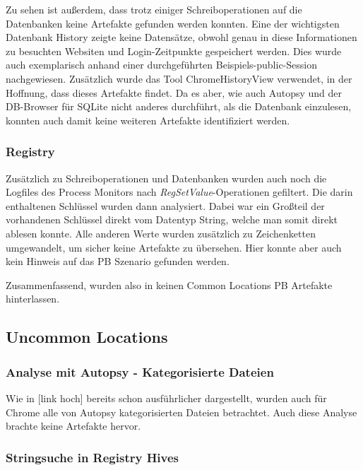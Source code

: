 \begin{appendices}
Zu sehen ist außerdem, dass trotz einiger Schreiboperationen auf die Datenbanken keine Artefakte gefunden werden konnten. Eine der wichtigsten Datenbank \glqq{}History\grqq{} zeigte keine Datensätze, obwohl genau in diese Informationen zu besuchten Websiten und Login-Zeitpunkte gespeichert werden. Dies wurde auch exemplarisch anhand einer durchgeführten Beispiels-public-Session nachgewiesen. Zusätzlich wurde das Tool \glqq{}ChromeHistoryView\grqq{} verwendet, in der Hoffnung, dass dieses Artefakte findet. Da es aber, wie auch Autopsy und der DB-Browser für SQLite nicht anderes durchführt, als die Datenbank einzulesen, konnten auch damit keine weiteren Artefakte identifiziert werden.

\subsubsection*{Registry}

Zusätzlich zu Schreiboperationen und Datenbanken wurden auch noch die Logfiles des Process Monitors nach \textit{RegSetValue}-Operationen gefiltert. Die darin enthaltenen Schlüssel wurden dann analysiert. Dabei war ein Großteil der vorhandenen Schlüssel direkt vom Datentyp String, welche man somit direkt ablesen konnte. Alle anderen Werte wurden zusätzlich zu Zeichenketten umgewandelt, um sicher keine Artefakte zu übersehen. Hier konnte aber auch kein Hinweis auf das PB Szenario gefunden werden. 

Zusammenfassend, wurden also in keinen Common Locations PB Artefakte hinterlassen.

\subsection*{Uncommon Locations}

\subsubsection*{Analyse mit Autopsy - Kategorisierte Dateien}

Wie in [link hoch] bereits schon ausführlicher dargestellt, wurden auch für Chrome alle von Autopsy kategorisierten Dateien betrachtet. Auch diese Analyse brachte keine Artefakte hervor.

\subsubsection*{Stringsuche in Registry Hives}


\end{appendices}
